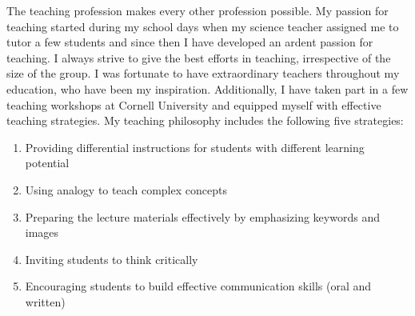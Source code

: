 \documentclass[11pt]{article}
\begin{document}
\justify
{\hspace{1em} The teaching profession makes every other profession possible. My passion for teaching started during my school days when my science teacher assigned me to tutor a few students and since then I have developed an ardent passion for teaching. I always strive to give the best efforts in teaching, irrespective of the size of the group. I was fortunate to have extraordinary teachers throughout my education, who have been my inspiration. Additionally, I have taken part in a few teaching workshops at Cornell University and equipped myself with effective teaching strategies. My teaching philosophy includes the following five strategies:

\begin{enumerate}[itemsep = -1pt]
\item Providing differential instructions for students with different learning potential 
\item Using analogy to teach complex concepts
\item Preparing the lecture materials effectively by emphasizing keywords and images
\item Inviting students to think critically
\item Encouraging students to build effective communication skills (oral and written)
\end{enumerate}

}
\end{document}
